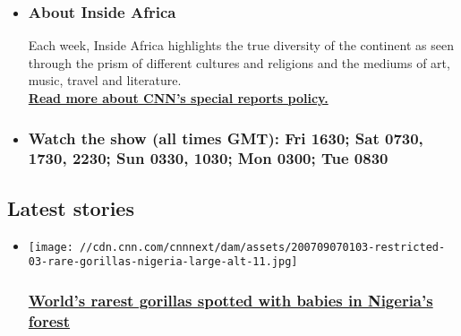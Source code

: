\begin{itemize}
\item
  \hypertarget{about-inside-africa}{%
  \subsubsection{About Inside Africa}\label{about-inside-africa}}

  Each week, Inside Africa highlights the true diversity of the
  continent as seen through the prism of different cultures and
  religions and the mediums of art, music, travel and literature.\\
  \href{/2015/01/02/world/sponsorships-policy/index.html}{\textbf{Read
  more about CNN's special reports policy.}}
\item
  \hypertarget{watch-the-show-all-times-gmt-fri-1630-sat-0730-1730-2230-sun-0330-1030-mon-0300-tue-0830}{%
  \subsubsection{Watch the show (all times GMT): Fri 1630; Sat 0730,
  1730, 2230; Sun 0330, 1030; Mon 0300; Tue
  0830}\label{watch-the-show-all-times-gmt-fri-1630-sat-0730-1730-2230-sun-0330-1030-mon-0300-tue-0830}}
\end{itemize}

\hypertarget{latest-stories-}{%
\subsection{Latest stories~}\label{latest-stories-}}

\begin{itemize}
\item
  \href{/2020/07/09/africa/rare-gorillas-nigeria-scn/index.html}{}

  \texttt{[image: //cdn.cnn.com/cnnnext/dam/assets/200709070103-restricted-03-rare-gorillas-nigeria-large-alt-11.jpg]}

  \hypertarget{worlds-rarest-gorillas-spotted-with-babies-in-nigerias-forest}{%
  \subsubsection{\texorpdfstring{\href{/2020/07/09/africa/rare-gorillas-nigeria-scn/index.html}{World's
  rarest gorillas spotted with babies in Nigeria's
  forest}}{World's rarest gorillas spotted with babies in Nigeria's forest}}\label{worlds-rarest-gorillas-spotted-with-babies-in-nigerias-forest}}
\end{itemize}

